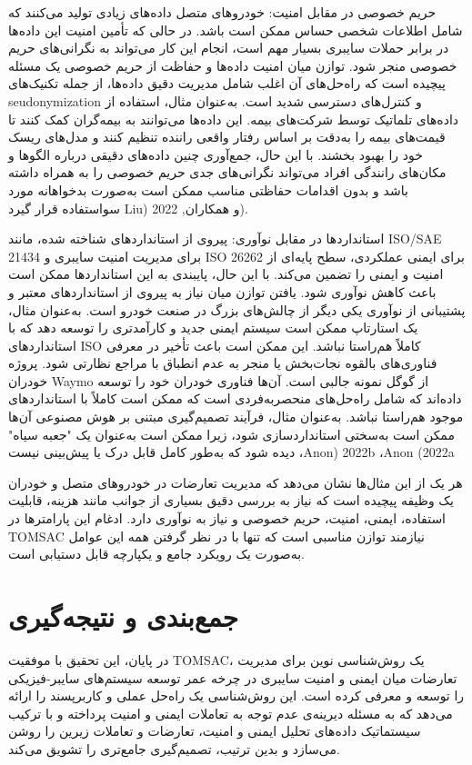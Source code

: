 \documentclass[a4paper,10pt]{article}
\begin{document}
        حریم خصوصی در مقابل امنیت: خودروهای متصل داده‌های زیادی تولید می‌کنند که شامل اطلاعات شخصی حساس ممکن است باشد. در حالی که تأمین امنیت این داده‌ها در برابر حملات سایبری بسیار مهم است، انجام این کار می‌تواند به نگرانی‌های حریم خصوصی منجر شود. توازن میان امنیت داده‌ها و حفاظت از حریم خصوصی یک مسئله پیچیده است که راه‌حل‌های آن اغلب شامل مدیریت دقیق داده‌ها، از جمله تکنیک‌های seudonymization و کنترل‌های دسترسی شدید است. به‌عنوان مثال، استفاده از داده‌های تلماتیک توسط شرکت‌های بیمه. این داده‌ها می‌توانند به بیمه‌گران کمک کنند تا قیمت‌های بیمه را به‌دقت بر اساس رفتار واقعی راننده تنظیم کنند و مدل‌های ریسک خود را بهبود بخشند. با این حال، جمع‌آوری چنین داده‌های دقیقی درباره الگوها و مکان‌های رانندگی افراد می‌تواند نگرانی‌های جدی حریم خصوصی را به همراه داشته باشد و بدون اقدامات حفاظتی مناسب ممکن است به‌صورت بدخواهانه مورد سواستفاده قرار گیرد Liu) و همکاران, 2022).

        استانداردها در مقابل نوآوری: پیروی از استانداردهای شناخته شده، مانند ISO/SAE 21434 برای مدیریت امنیت سایبری و ISO 26262 برای ایمنی عملکردی، سطح پایه‌ای از امنیت و ایمنی را تضمین می‌کند. با این حال، پایبندی به این استانداردها ممکن است باعث کاهش نوآوری شود. یافتن توازن میان نیاز به پیروی از استانداردهای معتبر و پشتیبانی از نوآوری یکی دیگر از چالش‌های بزرگ در صنعت خودرو است. به‌عنوان مثال، یک استارتاپ ممکن است سیستم ایمنی جدید و کارآمدتری را توسعه دهد که با استانداردهای ISO کاملاً هم‌راستا نباشد. این ممکن است باعث تأخیر در معرفی فناوری‌های بالقوه نجات‌بخش یا منجر به عدم انطباق با مراجع نظارتی شود. پروژه خودران Waymo از گوگل نمونه جالبی است. آن‌ها فناوری خودران خود را توسعه داده‌اند که شامل راه‌حل‌های منحصربه‌فردی است که ممکن است کاملاً با استانداردهای موجود هم‌راستا نباشد. به‌عنوان مثال، فرآیند تصمیم‌گیری مبتنی بر هوش مصنوعی آن‌ها ممکن است به‌سختی استانداردسازی شود، زیرا ممکن است به‌عنوان یک "جعبه سیاه" دیده شود که به‌طور کامل قابل درک یا پیش‌بینی نیست ،Anon) 2022b ،Anon (2022a

        هر یک از این مثال‌ها نشان می‌دهد که مدیریت تعارضات در خودروهای متصل و خودران یک وظیفه پیچیده است که نیاز به بررسی دقیق بسیاری از جوانب مانند هزینه، قابلیت استفاده، ایمنی، امنیت، حریم خصوصی و نیاز به نوآوری دارد. ادغام این پارامترها در TOMSAC نیازمند توازن مناسبی است که تنها با در نظر گرفتن همه این عوامل به‌صورت یک رویکرد جامع و یکپارچه قابل دستیابی است.

    \section{جمع‌بندی و نتیجه‌گیری}

        در پایان، این تحقیق با موفقیت TOMSAC، یک روش‌شناسی نوین برای مدیریت تعارضات میان ایمنی و امنیت سایبری در چرخه عمر توسعه سیستم‌های سایبر-فیزیکی را توسعه و معرفی کرده است. این روش‌شناسی یک راه‌حل عملی و کاربرپسند را ارائه می‌دهد که به مسئله دیرینه‌ی عدم توجه به تعاملات ایمنی و امنیت پرداخته و با ترکیب سیستماتیک داده‌های تحلیل ایمنی و امنیت، تعارضات و تعاملات زیرین را روشن می‌سازد و بدین ترتیب، تصمیم‌گیری جامع‌تری را تشویق می‌کند.
\end{document}
